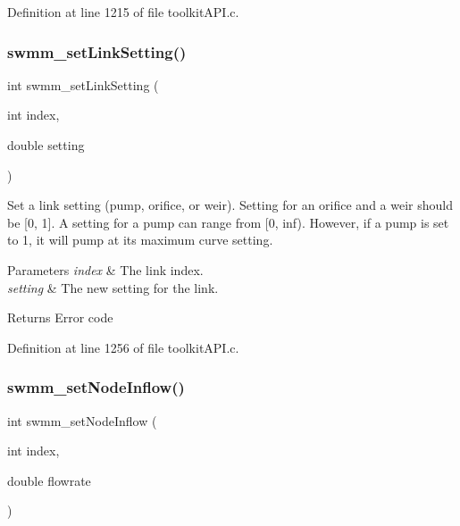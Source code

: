 Definition at line 1215 of file toolkit\+A\+P\+I.\+c.

\mbox{\label{group__tkfuncs_gab44d2b1c21a6f750b0ce4c48ba16be81}} 
\subsubsection{\texorpdfstring{swmm\+\_\+set\+Link\+Setting()}{swmm\_setLinkSetting()}}
{\footnotesize\ttfamily int swmm\+\_\+set\+Link\+Setting (\begin{DoxyParamCaption}\item[{int}]{index,  }\item[{double}]{setting }\end{DoxyParamCaption})}



Set a link setting (pump, orifice, or weir). Setting for an orifice and a weir should be \mbox{[}0, 1\mbox{]}. A setting for a pump can range from \mbox{[}0, inf). However, if a pump is set to 1, it will pump at its maximum curve setting. 


\begin{DoxyParams}{Parameters}
{\em index} & The link index. \\
\hline
{\em setting} & The new setting for the link. \\
\hline
\end{DoxyParams}
\begin{DoxyReturn}{Returns}
Error code 
\end{DoxyReturn}


Definition at line 1256 of file toolkit\+A\+P\+I.\+c.

\mbox{\label{group__tkfuncs_ga6438a8a45d7712b8b02ba630cd8e1db3}} 
\subsubsection{\texorpdfstring{swmm\+\_\+set\+Node\+Inflow()}{swmm\_setNodeInflow()}}
{\footnotesize\ttfamily int swmm\+\_\+set\+Node\+Inflow (\begin{DoxyParamCaption}\item[{int}]{index,  }\item[{double}]{flowrate }\end{DoxyParamCaption})}



